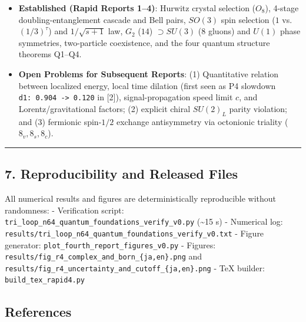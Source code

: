 \documentclass[
  a4paper,
]{article}
\providecommand{\tightlist}{%
  \setlength{\itemsep}{0pt}\setlength{\parskip}{0pt}}
\begin{document}
\begin{itemize}
\tightlist
\item
  \textbf{Established (Rapid Reports 1--4)}: Hurwitz crystal selection
  (\(O_8\)), 4-stage doubling-entanglement cascade and Bell pairs,
  \(SO(3)\) spin selection (\(1\) vs.~\((1/3)^\tau\)) and
  \(1/\sqrt{s+1}\) law, \(G_2\) (\(14\)) \(\supset SU(3)\) (\(8\)
  gluons) and \(U(1)\) phase symmetries, two-particle coexistence, and
  the four quantum structure theorems Q1--Q4.
\item
  \textbf{Open Problems for Subsequent Reports}: (1) Quantitative
  relation between localized energy, local time dilation (first seen as
  P4 slowdown \texttt{d1:\ 0.904\ -\textgreater{}\ 0.120} in {[}2{]}),
  signal-propagation speed limit \(c\), and Lorentz/gravitational
  factors; (2) explicit chiral \(SU(2)_L\) parity violation; and (3)
  fermionic spin-\(1/2\) exchange antisymmetry via octonionic triality
  (\(8_v, 8_s, 8_c\)).
\end{itemize}

\begin{center}\rule{0.5\linewidth}{0.5pt}\end{center}

\subsection{7. Reproducibility and Released
Files}\label{reproducibility-and-released-files}

All numerical results and figures are deterministically reproducible
without randomness: - Verification script:
\texttt{tri\_loop\_n64\_quantum\_foundations\_verify\_v0.py}
(\textasciitilde15 s) - Numerical log:
\texttt{results/tri\_loop\_n64\_quantum\_foundations\_verify\_v0.txt} -
Figure generator: \texttt{plot\_fourth\_report\_figures\_v0.py} -
Figures: \texttt{results/fig\_r4\_complex\_and\_born\_\{ja,en\}.png} and
\texttt{results/fig\_r4\_uncertainty\_and\_cutoff\_\{ja,en\}.png} - TeX
builder: \texttt{build\_tex\_rapid4.py}

\subsection{References}\label{references}
\end{document}
